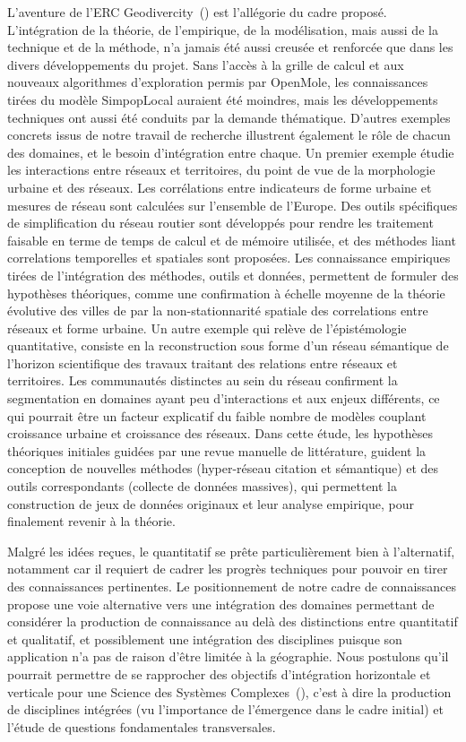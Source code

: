 \documentclass[11pt]{article}
\begin{document}
L'aventure de l'ERC Geodivercity~(\cite{pumain2017book}) est l'allégorie du cadre proposé. L'intégration de la théorie, de l'empirique, de la modélisation, mais aussi de la technique et de la méthode, n'a jamais été aussi creusée et renforcée que dans les divers développements du projet. Sans l'accès à la grille de calcul et aux nouveaux algorithmes d'exploration permis par OpenMole, les connaissances tirées du modèle SimpopLocal auraient été moindres, mais les développements techniques ont aussi été conduits par la demande thématique. D'autres exemples concrets issus de notre travail de recherche illustrent également le rôle de chacun des domaines, et le besoin d'intégration entre chaque. Un premier exemple étudie les interactions entre réseaux et territoires, du point de vue de la morphologie urbaine et des réseaux. Les corrélations entre indicateurs de forme urbaine et mesures de réseau sont calculées sur l'ensemble de l'Europe. Des outils spécifiques de simplification du réseau routier sont développés pour rendre les traitement faisable en terme de temps de calcul et de mémoire utilisée, et des méthodes liant correlations temporelles et spatiales sont proposées. Les connaissance empiriques tirées de l'intégration des méthodes, outils et données, permettent de formuler des hypothèses théoriques, comme une confirmation à échelle moyenne de la théorie évolutive des villes de par la non-stationnarité spatiale des correlations entre réseaux et forme urbaine. Un autre exemple qui relève de l'épistémologie quantitative, consiste en la reconstruction sous forme d'un réseau sémantique de l'horizon scientifique des travaux traitant des relations entre réseaux et territoires. Les communautés distinctes au sein du réseau confirment la segmentation en domaines ayant peu d'interactions et aux enjeux différents, ce qui pourrait être un facteur explicatif du faible nombre de modèles couplant croissance urbaine et croissance des réseaux. Dans cette étude, les hypothèses théoriques initiales guidées par une revue manuelle de littérature, guident la conception de nouvelles méthodes (hyper-réseau citation et sémantique) et des outils correspondants (collecte de données massives), qui permettent la construction de jeux de données originaux et leur analyse empirique, pour finalement revenir à la théorie.


\bigskip


Malgré les idées reçues, le quantitatif se prête particulièrement bien à l'alternatif, notamment car il requiert de cadrer les progrès techniques pour pouvoir en tirer des connaissances pertinentes. Le positionnement de notre cadre de connaissances propose une voie alternative vers une intégration des domaines permettant de considérer la production de connaissance au delà des distinctions entre quantitatif et qualitatif, et possiblement une intégration des disciplines puisque son application n'a pas de raison d'être limitée à la géographie. Nous postulons qu'il pourrait permettre de se rapprocher des objectifs d'intégration horizontale et verticale pour une Science des Systèmes Complexes~(\cite{chavalarias2009french}), c'est à dire la production de disciplines intégrées (vu l'importance de l'émergence dans le cadre initial) et l'étude de questions fondamentales transversales.
\end{document}
